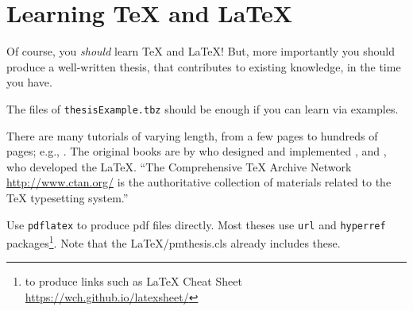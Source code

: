 \chapter{Learning {\TeX} and {\LaTeX}}

Of course, you {\em should} learn {{\TeX} and {\LaTeX}}!  But, more
importantly you should produce a well-written thesis, that contributes
to existing knowledge, in the time you have.

The files of {\tt thesisExample.tbz} should be enough if you can learn
via examples.

There are many tutorials of varying length, from a few pages to
hundreds of pages; e.g., \cite{WikiBooks}.  The original books are by
\cite{Knuth} who designed and implemented \TEX{}, and \cite{Lamport},
who developed the \LaTeX{}.  ``The Comprehensive TeX Archive Network
\url{http://www.ctan.org/} is the authoritative collection of
materials related to the TeX typesetting system.''

Use {\tt pdflatex} to produce pdf files directly.  Most theses use
{\tt url} and {\tt hyperref} packages\footnote{to produce links such
  as {\LaTeX{} Cheat Sheet} \url{https://wch.github.io/latexsheet/}}.
Note that the LaTeX/pmthesis.cls already includes these.

